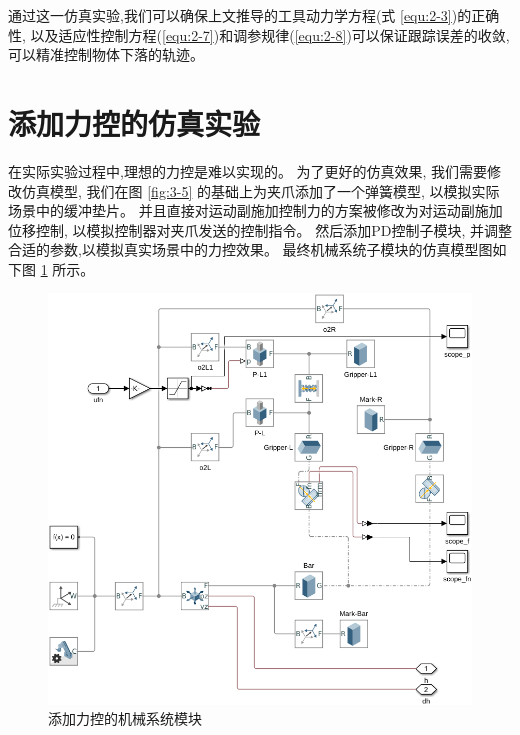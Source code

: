 通过这一仿真实验,我们可以确保上文推导的工具动力学方程(式 \ref{equ:2-3})的正确性,
以及适应性控制方程(\ref{equ:2-7})和调参规律(\ref{equ:2-8})可以保证跟踪误差的收敛,
可以精准控制物体下落的轨迹。


\section{添加力控的仿真实验}
在实际实验过程中,理想的力控是难以实现的。
为了更好的仿真效果, 我们需要修改仿真模型,
我们在图 \ref{fig:3-5} 的基础上为夹爪添加了一个弹簧模型, 以模拟实际场景中的缓冲垫片。
并且直接对运动副施加控制力的方案被修改为对运动副施加位移控制,
以模拟控制器对夹爪发送的控制指令。
然后添加PD控制子模块, 并调整合适的参数,以模拟真实场景中的力控效果。
最终机械系统子模块的仿真模型图如下图 \ref{fig:mech_x} 所示。

\begin{figure}[!ht]
  \centering
  \includegraphics[width=13cm]{chapter04/pic/mech_x}
  \caption{\label{fig:mech_x}
    添加力控的机械系统模块}
  \vspace{-0.3cm}
\end{figure}

